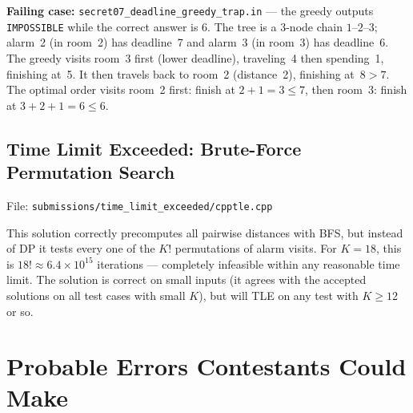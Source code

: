 \documentclass[11pt]{article}
\begin{document}
\textbf{Failing case:} \texttt{secret07\_deadline\_greedy\_trap.in} ---
the greedy outputs \texttt{IMPOSSIBLE} while the correct answer is $6$.
The tree is a 3-node chain $1\text{--}2\text{--}3$; alarm~2 (in room~2) has
deadline~7 and alarm~3 (in room~3) has deadline~6.  The greedy visits room~3
first (lower deadline), traveling~4 then spending~1, finishing at~5.  It then
travels back to room~2 (distance~2), finishing at~8$>7$.  The optimal order
visits room~2 first: finish at $2+1=3\le7$, then room~3: finish at $3+2+1=6\le6$.

\subsection*{Time Limit Exceeded: Brute-Force Permutation Search}

File: \texttt{submissions/time\_limit\_exceeded/cpptle.cpp}

This solution correctly precomputes all pairwise distances with BFS, but
instead of DP it tests every one of the $K!$ permutations of alarm visits.
For $K=18$, this is $18!\approx6.4\times10^{15}$ iterations --- completely
infeasible within any reasonable time limit.  The solution is correct on
small inputs (it agrees with the accepted solutions on all test cases with
small $K$), but will TLE on any test with $K\ge12$ or so.

\section*{Probable Errors Contestants Could Make}
\end{document}
